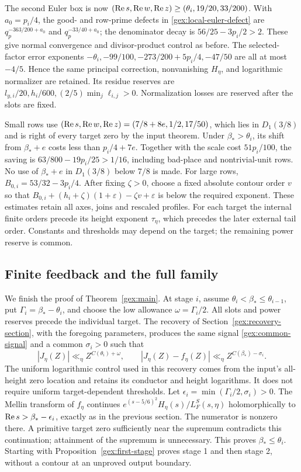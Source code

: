 The second Euler box is now
\((\operatorname{Re} s,\operatorname{Re} w,\operatorname{Re} z)\ge(\theta_i,19/20,33/200)\).
With \(a_0=p_i/4\), the good- and row-prime defects in
\eqref{gex:local-euler-defect} are
\(q_p^{-363/200+a_0}\) and \(q_p^{-33/40+a_0}\);
the denominator decay is \(56/25-3p_i/2>2\).
These give normal convergence and divisor-product control as before.
The selected-factor error exponents
\(-\theta_i,-99/100,-273/200+5p_i/4,-47/50\)
are all at most \(-4/5\). Hence the same principal correction,
nonvanishing \(H_\eta\), and logarithmic normalizer are retained.
Its residue reserves are
\(l_{y,i}/20,h_i/600,(2/5)\min_j\ell_{i,j}>0\).
Normalization losses are reserved after the slots are fixed.

Small rows use \((\operatorname{Re} s,\operatorname{Re} w,\operatorname{Re} z)=(7/8+8e,1/2,17/50)\),
which lies in \(D_1(3/8)\) and is right of every target zero by the
input theorem. Under \(\beta_*>\theta_i\), its shift from
\(\beta_*+e\) costs less than \(p_i/4+7e\). Together with the scale
cost \(51p_i/100\), the saving is
\(63/800-19p_i/25>1/16\), including bad-place and nontrivial-unit
rows. No use of \(\beta_*+e\) in \(D_1(3/8)\) below \(7/8\) is made.
For large rows, \(B_{0,i}=53/32-3p_i/4\). After fixing \(\zeta>0\),
choose a fixed absolute contour order \(v\) so that
\(B_{0,i}+(h_i+\zeta)(1+\varepsilon)-\zeta v+\varepsilon\)
is below the required exponent. These estimates retain all axes,
joins and rescaled profiles. For each target the internal finite
orders precede its height exponent \(\tau_\eta\), which precedes
the later external tail order. Constants and thresholds may depend
on the target; the remaining power reserve is common.

\subsection{Finite feedback and the full family}

We finish the proof of Theorem~\ref{gex:main}. At stage \(i\), assume
\(\theta_i<\beta_*\le\theta_{i-1}\), put
\(\Gamma_i=\beta_*-\theta_i\), and choose the low allowance
\(\omega=\Gamma_i/2\). All slots and power reserves precede the
individual target. The recovery of Section~\ref{gex:recovery-section},
with the foregoing parameters, produces the same signal
\eqref{gex:common-signal} and a common \(\sigma_i>0\) such that
\[
 |J_\eta(Z)|\ll_\eta Z^{C(\theta_i)+\omega},\qquad
 |J_\eta(Z)-f_\eta(Z)|\ll_\eta Z^{C(\beta_*)-\sigma_i}.
\]
The uniform logarithmic control used in this recovery comes from the
input's all-height zero location and retains its conductor and height
logarithms. It does not require uniform target-dependent thresholds.
Let \(\epsilon_i=\min(\Gamma_i/2,\sigma_i)>0\).
The Mellin transform of \(f_\eta\) continues
\(e^{(s-5/6)^2}H_\eta(s)/L_F^S(s,\eta)\) holomorphically to
\(\operatorname{Re} s>\beta_*-\epsilon_i\), exactly as in the previous section.
The numerator is nonzero there. A primitive target zero sufficiently
near the supremum contradicts this continuation; attainment of the
supremum is unnecessary. This proves \(\beta_*\le\theta_i\).
Starting with Proposition~\ref{gex:first-stage} proves stage 1 and
then stage 2, without a contour at an unproved output boundary.

